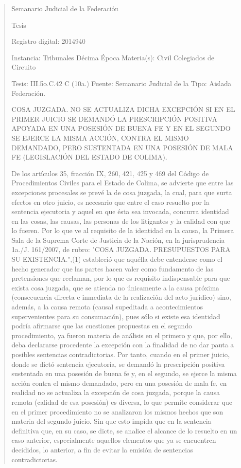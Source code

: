 \documentclass[11pt,a4paper]{article}
\begin{document}
\begin{quote}
                                                   Semanario Judicial de la Federación

                                                Tesis

 Registro digital: 2014940

 Instancia: Tribunales             Décima Época                           Materia(s): Civil
 Colegiados de Circuito

 Tesis: III.5o.C.42 C (10a.)       Fuente: Semanario Judicial de la       Tipo: Aislada
                                   Federación.


COSA JUZGADA. NO SE ACTUALIZA DICHA EXCEPCIÓN SI EN EL PRIMER JUICIO SE
DEMANDÓ LA PRESCRIPCIÓN POSITIVA APOYADA EN UNA POSESIÓN DE BUENA FE Y EN
EL SEGUNDO SE EJERCE LA MISMA ACCIÓN, CONTRA EL MISMO DEMANDADO, PERO
SUSTENTADA EN UNA POSESIÓN DE MALA FE (LEGISLACIÓN DEL ESTADO DE COLIMA).


De los artículos 35, fracción IX, 260, 421, 425 y 469 del Código de Procedimientos Civiles para el
Estado de Colima, se advierte que entre las excepciones procesales se prevé la de cosa juzgada, la
cual, para que surta efectos en otro juicio, es necesario que entre el caso resuelto por la sentencia
ejecutoria y aquel en que ésta sea invocada, concurra identidad en las cosas, las causas, las
personas de los litigantes y la calidad con que lo fueren. Por lo que ve al requisito de la identidad en
la causa, la Primera Sala de la Suprema Corte de Justicia de la Nación, en la jurisprudencia 1a./J.
161/2007, de rubro: "COSA JUZGADA. PRESUPUESTOS PARA SU EXISTENCIA.",(1) estableció
que aquélla debe entenderse como el hecho generador que las partes hacen valer como
fundamento de las pretensiones que reclaman, por lo que es requisito indispensable para que exista
cosa juzgada, que se atienda no únicamente a la causa próxima (consecuencia directa e inmediata
de la realización del acto jurídico) sino, además, a la causa remota (causal supeditada a
acontecimientos supervenientes para su consumación), pues sólo si existe esa identidad podría
afirmarse que las cuestiones propuestas en el segundo procedimiento, ya fueron materia de análisis
en el primero y que, por ello, deba declararse procedente la excepción con la finalidad de no dar
pauta a posibles sentencias contradictorias. Por tanto, cuando en el primer juicio, donde se dictó
sentencia ejecutoria, se demandó la prescripción positiva sustentada en una posesión de buena fe
y, en el segundo, se ejerce la misma acción contra el mismo demandado, pero en una posesión de
mala fe, en realidad no se actualiza la excepción de cosa juzgada, porque la causa remota (calidad
de esa posesión) es diversa, lo que permite considerar que en el primer procedimiento no se
analizaron los mismos hechos que son materia del segundo juicio. Sin que esto impida que en la
sentencia definitiva que, en su caso, se dicte, se analice el alcance de lo resuelto en un caso
anterior, especialmente aquellos elementos que ya se encuentren decididos, lo anterior, a fin de
evitar la emisión de sentencias contradictorias.


\end{quote}
\end{document}
